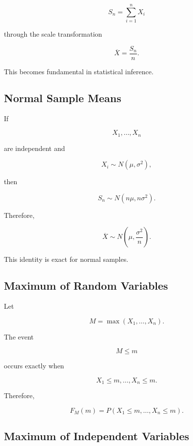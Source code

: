\[
S_n
=
\sum_{i=1}^{n}X_i
\]

through the scale transformation

\[
\overline{X}
=
\frac{S_n}{n}.
\]

This becomes fundamental in statistical inference.

\subsection{Normal Sample Means}
\label{subsec:normal-sample-means}

If

\[
X_1,\ldots,X_n
\]

are independent and

\[
X_i\sim N(\mu,\sigma^2),
\]

then

\[
S_n
\sim
N(n\mu,n\sigma^2).
\]

Therefore,

\[
\boxed{
\overline{X}
\sim
N
\left(
\mu,
\frac{\sigma^2}{n}
\right).
}
\]

This identity is exact for normal samples.

\subsection{Maximum of Random Variables}
\label{subsec:maximum-random-variables}

Let

\[
M=\max(X_1,\ldots,X_n).
\]

The event

\[
M\leq m
\]

occurs exactly when

\[
X_1\leq m,
\ldots,
X_n\leq m.
\]

Therefore,

\[
\boxed{
F_M(m)
=
P(X_1\leq m,\ldots,X_n\leq m).
}
\]

\subsection{Maximum of Independent Variables}
\label{subsec:maximum-independent-rvs}

